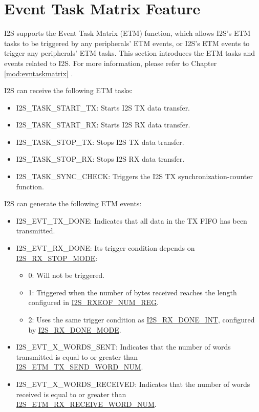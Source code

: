 \documentclass[main\_\_EN.tex]{subfiles}
\begin{document}
\section{Event Task Matrix Feature}\label{sec:i2s-etm-func}

\chipname{} I2S supports the Event Task Matrix (ETM) function, which allows I2S's ETM tasks to be triggered by any peripherals' ETM events, or I2S's ETM events to trigger any peripherals' ETM tasks. This section introduces the ETM tasks and events related to I2S. For more information, please refer to Chapter \ref{mod:evntaskmatrix} .

I2S can receive the following ETM tasks:

\begin{itemize}
    \item \label{task:I2STASKSTARTTX}I2S\_TASK\_START\_TX: Starts I2S TX data transfer.
    \item \label{task:I2STASKSTARTRX}I2S\_TASK\_START\_RX: Starts I2S RX data transfer.
    \item \label{task:I2STASKSTOPTX}I2S\_TASK\_STOP\_TX: Stops I2S TX data transfer.
    \item \label{task:I2STASKSTOPRX}I2S\_TASK\_STOP\_RX: Stops I2S RX data transfer.
    \item \label{task:I2STASKSYNCCHECK}I2S\_TASK\_SYNC\_CHECK: Triggers the I2S TX synchronization-counter function.
\end{itemize}

I2S can generate the following ETM events:

\begin{itemize}
    \item \label{evt:I2SEVTTXDONE}I2S\_EVT\_TX\_DONE: Indicates that all data in the TX FIFO has been transmitted.
    \item \label{evt:I2SEVTRXDONE}I2S\_EVT\_RX\_DONE: Its trigger condition depends on \hyperref[fielddesc:I2SRXSTOPMODE]{I2S\_RX\_STOP\_MODE}:
    \begin{itemize}
        \item 0: Will not be triggered.
        \item 1: Triggered when the number of bytes received reaches the length configured in \hyperref[regdesc:I2SRXEOFNUMREG]{I2S\_RXEOF\_NUM\_REG}.
        \item 2: Uses the same trigger condition as \hyperref[int:I2SRXDONEINT]{I2S\_RX\_DONE\_INT}, configured by \hyperref[fielddesc:I2SRXDONEMODE]{I2S\_RX\_DONE\_MODE}.
    \end{itemize}
    \item \label{evt:I2SEVTXWORDSSENT}I2S\_EVT\_X\_WORDS\_SENT: Indicates that the number of words transmitted is equal to or greater than \hyperref[fielddesc:I2SETMTXSENDWORDNUM]{I2S\_ETM\_TX\_SEND\_WORD\_NUM}.
    \item \label{evt:I2SEVTXWORDSRECEIVED}I2S\_EVT\_X\_WORDS\_RECEIVED: Indicates that the number of words received is equal to or greater than \hyperref[fielddesc:I2SETMRXRECEIVEWORDNUM]{I2S\_ETM\_RX\_RECEIVE\_WORD\_NUM}.
\end{itemize}
\end{document}
